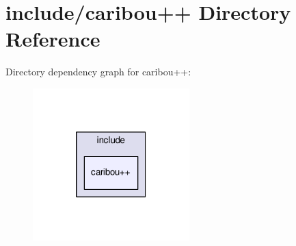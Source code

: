 \section{include/caribou++ Directory Reference}
\label{dir_b93771941ad066ad35f3336f542766e6}
Directory dependency graph for caribou++\-:\nopagebreak
\begin{figure}[H]
\begin{center}
\leavevmode
\includegraphics[width=172pt]{dir_b93771941ad066ad35f3336f542766e6_dep}
\end{center}
\end{figure}

